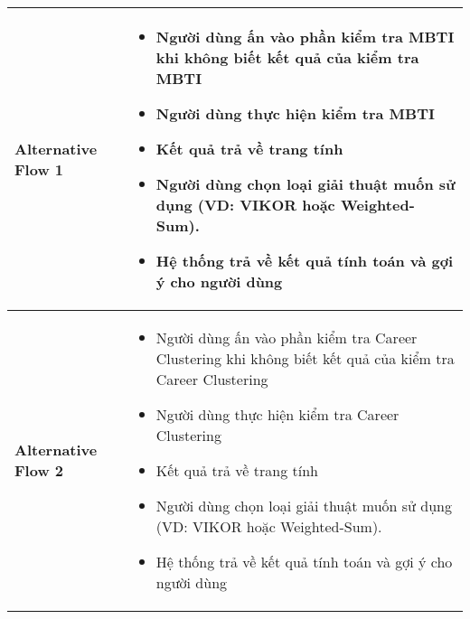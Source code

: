 \begin{longtable}[H]{|l|p{}|}
        \hline
        
        \textbf{Alternative Flow 1} &  \vspace{-0.75cm} \begin{itemize}[leftmargin=4mm]
            \setlength\itemsep{0em}
            \item Người dùng ấn vào phần kiểm tra MBTI khi không biết kết quả của kiểm tra MBTI
            \item Người dùng thực hiện kiểm tra MBTI
            \item Kết quả trả về trang tính
            \item Người dùng chọn loại giải thuật muốn sử dụng (VD: VIKOR hoặc Weighted-Sum). 
            \item Hệ thống trả về kết quả tính toán và gợi ý cho người dùng
        \end{itemize} \\
        
        \hline
        
        \textbf{Alternative Flow 2} & \vspace{-0.75cm} \begin{itemize}[leftmargin=4mm]
            \setlength\itemsep{0em}
            \item Người dùng ấn vào phần kiểm tra Career Clustering 
            khi không biết kết quả của kiểm tra Career Clustering
            \item Người dùng thực hiện kiểm tra Career Clustering
            \item Kết quả trả về trang tính
            \item Người dùng chọn loại giải thuật muốn sử dụng (VD: VIKOR hoặc Weighted-Sum). 
            \item Hệ thống trả về kết quả tính toán và gợi ý cho người dùng
        \end{itemize} \\

        \hline 
        

\end{longtable}

